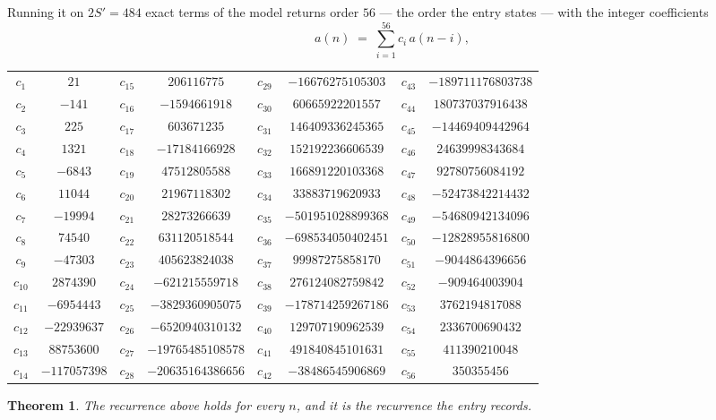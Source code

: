 \documentclass[11pt,a4paper]{article}
\theoremstyle{plain}
\newtheorem{theorem}{Theorem}
\theoremstyle{definition}
\begin{document}
Running it on $2S'=484$ exact terms of the model returns order $56$ --- the order the
entry states --- with the integer coefficients
\[
a(n)\;=\;\sum_{i=1}^{56}c_i\,a(n-i),
\]
\begin{center}\small
\begin{tabular}{cccccccc}
$c_{1}$ & $21$ & $c_{15}$ & $206116775$ & $c_{29}$ & $-16676275105303$ & $c_{43}$ & $-189711176803738$ \\
$c_{2}$ & $-141$ & $c_{16}$ & $-1594661918$ & $c_{30}$ & $60665922201557$ & $c_{44}$ & $180737037916438$ \\
$c_{3}$ & $225$ & $c_{17}$ & $603671235$ & $c_{31}$ & $146409336245365$ & $c_{45}$ & $-14469409442964$ \\
$c_{4}$ & $1321$ & $c_{18}$ & $-17184166928$ & $c_{32}$ & $152192236606539$ & $c_{46}$ & $24639998343684$ \\
$c_{5}$ & $-6843$ & $c_{19}$ & $47512805588$ & $c_{33}$ & $166891220103368$ & $c_{47}$ & $92780756084192$ \\
$c_{6}$ & $11044$ & $c_{20}$ & $21967118302$ & $c_{34}$ & $33883719620933$ & $c_{48}$ & $-52473842214432$ \\
$c_{7}$ & $-19994$ & $c_{21}$ & $28273266639$ & $c_{35}$ & $-501951028899368$ & $c_{49}$ & $-54680942134096$ \\
$c_{8}$ & $74540$ & $c_{22}$ & $631120518544$ & $c_{36}$ & $-698534050402451$ & $c_{50}$ & $-12828955816800$ \\
$c_{9}$ & $-47303$ & $c_{23}$ & $405623824038$ & $c_{37}$ & $99987275858170$ & $c_{51}$ & $-9044864396656$ \\
$c_{10}$ & $2874390$ & $c_{24}$ & $-621215559718$ & $c_{38}$ & $276124082759842$ & $c_{52}$ & $-909464003904$ \\
$c_{11}$ & $-6954443$ & $c_{25}$ & $-3829360905075$ & $c_{39}$ & $-178714259267186$ & $c_{53}$ & $3762194817088$ \\
$c_{12}$ & $-22939637$ & $c_{26}$ & $-6520940310132$ & $c_{40}$ & $129707190962539$ & $c_{54}$ & $2336700690432$ \\
$c_{13}$ & $88753600$ & $c_{27}$ & $-19765485108578$ & $c_{41}$ & $491840845101631$ & $c_{55}$ & $411390210048$ \\
$c_{14}$ & $-117057398$ & $c_{28}$ & $-20635164386656$ & $c_{42}$ & $-38486545906869$ & $c_{56}$ & $350355456$ \\
\end{tabular}
\end{center}

\begin{theorem}
The recurrence above holds for every $n$, and it is the recurrence the entry records.
\end{theorem}
\end{document}

